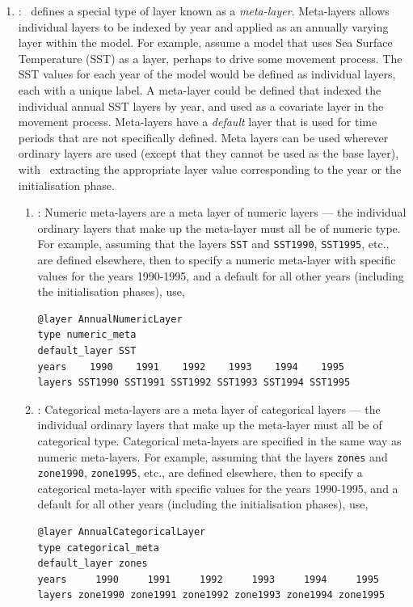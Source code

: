 \begin{enumerate}
\item {\label{meta-layers}}: \SPM\ defines a special type of layer known as a \emph{meta-layer}. Meta-layers allows individual layers to be indexed by year and applied as an annually varying layer within the model. For example, assume a model that uses Sea Surface Temperature (SST) as a layer, perhaps to drive some movement process. The SST values for each year of the model would be defined as individual layers, each with a unique label. A meta-layer could be defined that indexed the individual annual SST layers by year, and used as a covariate layer in the movement process. Meta-layers have a \emph{default} layer that is used for time periods that are not specifically defined. Meta layers can be used wherever ordinary layers are used (except that they cannot be used as the base layer), with \SPM\ extracting the appropriate layer value corresponding to the year or the initialisation phase.

\begin{enumerate}

\item {\label{numeric meta-layer}}: Numeric meta-layers are a meta layer of numeric layers --- the individual ordinary layers that make up the meta-layer must all be of numeric type. For example, assuming that the layers \texttt{SST} and \texttt{SST1990}, \texttt{SST1995}, etc., are defined elsewhere, then to specify a numeric meta-layer with specific values for the years 1990-1995, and a default for all other years (including the initialisation phases), use, 

{\small{\begin{verbatim}
@layer AnnualNumericLayer
type numeric_meta
default_layer SST
years    1990    1991    1992    1993    1994    1995
layers SST1990 SST1991 SST1992 SST1993 SST1994 SST1995
\end{verbatim}}}

\item {\label{categorical meta-layer}}: Categorical meta-layers are a meta layer of categorical layers --- the individual ordinary layers that make up the meta-layer must all be of categorical type. Categorical meta-layers are specified in the same way as numeric meta-layers. For example, assuming that the layers \texttt{zones} and \texttt{zone1990}, \texttt{zone1995}, etc., are defined elsewhere, then to specify a categorical meta-layer with specific values for the years 1990-1995, and a default for all other years (including the initialisation phases), use, 

{\small{\begin{verbatim}
@layer AnnualCategoricalLayer
type categorical_meta
default_layer zones
years     1990     1991     1992     1993     1994     1995
layers zone1990 zone1991 zone1992 zone1993 zone1994 zone1995
\end{verbatim}}}
\end{enumerate}
\end{enumerate}

